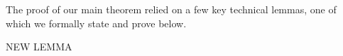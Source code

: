 \documentclass[11pt]{article}
\theoremstyle{plain}
\newtheorem{lemma}[theorem]{Lemma}
\begin{document}
The proof of our main theorem relied on a few key technical lemmas, one of which we formally state and prove below.

NEW LEMMA
\end{document}
